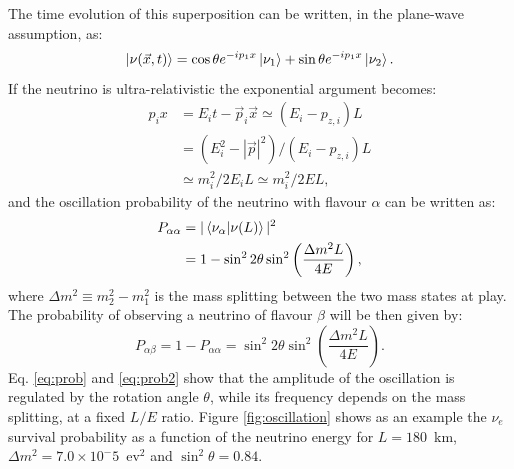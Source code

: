The time evolution of this superposition can be written, in the plane-wave assumption, as:
\begin{equation}
    \ket{\nu(\vec{x},t)} = \cos\theta e^{-ip_{1}x}\ket{\nu_{1}}+\sin\theta e^{-ip_{1}x}\ket{\nu_{2}}.
\end{equation}
If the neutrino is ultra-relativistic the exponential argument becomes:
\begin{equation}
\begin{split}
    p_{i}x & = E_{i}t - \vec{p}_{i}\vec{x} \simeq (E_{i}-p_{z,i})L\\
           & = (E_{i}^2-|\vec{p}|^{2})/(E_{i}-p_{z,i})L\\
           & \simeq m_i^{2}/2E_{i}L \simeq m_i^{2}/2E L,
\end{split}
\end{equation}
and the oscillation probability of the neutrino with flavour $\alpha$ can be written as:
\begin{equation}
\begin{split}
    P_{\alpha\alpha} & = |\bra{\nu_{\alpha}}\ket{\nu(L)}|^2\\
                     & = 1 - \sin^2 2\theta \sin^2\left(\frac{\Delta m^{2}L}{4E}\right),\label{eq:prob}
\end{split}
\end{equation}
where $\Delta m^{2} \equiv m^2_2-m^2_1$ is the mass splitting between the two mass states at play. The probability of observing a neutrino of flavour $\beta$ will be then given by:
\begin{equation}
    P_{\alpha\beta} = 1 - P_{\alpha\alpha} = \sin^2 2\theta \sin^2\left(\frac{\Delta m^{2}L}{4E}\right).\label{eq:prob2}
\end{equation}
Eq. \eqref{eq:prob} and \eqref{eq:prob2} show that the amplitude of the oscillation is regulated by the rotation angle $\theta$, while its frequency depends on the mass splitting, at a fixed $L/E$ ratio. Figure \ref{fig:oscillation} shows as an example the $\nu_e$ survival probability as a function of the neutrino energy for $L=180$~km, $\Delta m^2 = 7.0 \times 10^-5$~ev$^2$ and $\sin^2\theta = 0.84$. 

